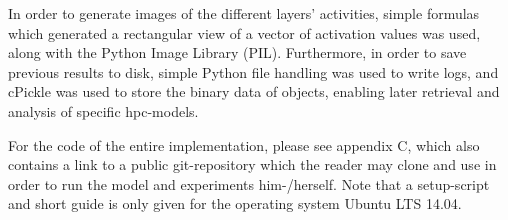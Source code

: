 In order to generate images of the different layers' activities, simple formulas which generated a rectangular view of a vector of activation values was used, along with the Python Image Library (PIL). Furthermore, in order to save previous results to disk, simple Python file handling was used to write logs, and cPickle was used to store the binary data of objects, enabling later retrieval and analysis of specific hpc-models.

For the code of the entire implementation, please see appendix C, which also contains a link to a public git-repository which the reader may clone and use in order to run the model and experiments him-/herself. Note that a setup-script and short guide is only given for the operating system Ubuntu LTS 14.04.













\cleardoublepage